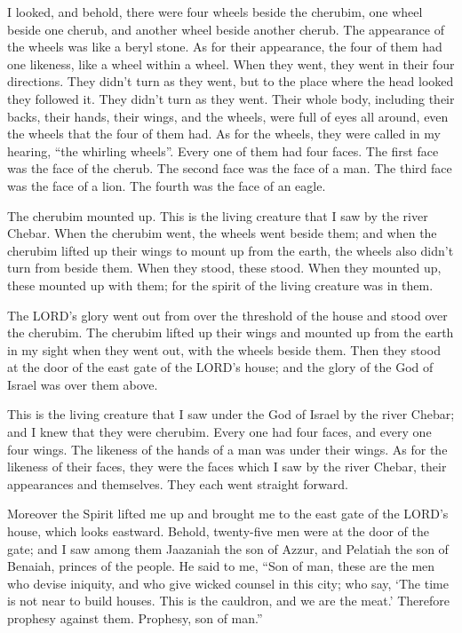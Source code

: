 \myverse{}I looked, and behold, there were four wheels beside the cherubim,
one wheel beside one cherub, and another wheel beside another cherub. The appearance of the wheels was
like a beryl stone.
\myverse{}As for their appearance, the four of them had one likeness, like a wheel
within a wheel.
\myverse{}When they went, they went in their four directions. They didn’t turn as they
went, but to the place where the head looked they followed it. They didn’t turn as they went.
\myverse{}Their whole body, including their backs, their hands, their wings, and the
wheels, were full of eyes all around, even the wheels that the four of them had.
\myverse{}As for the wheels, they were called in my hearing, “the whirling wheels”.
\myverse{}Every one of them had four faces. The first face was the face of the cherub.
The second face was the face of a man. The third face was the face of a lion. The fourth was the face
of an eagle.

\myverse{}The cherubim mounted up. This is the living creature that I
saw by the river Chebar.
\myverse{}When the cherubim went, the wheels went beside them; and when the cherubim
lifted up their wings to mount up from the earth, the wheels also didn’t turn from beside them.
\myverse{}When they stood, these stood. When they mounted up, these mounted up with
them; for the spirit of the living creature was in them.

\myverse{}The LORD’s glory went out from over the threshold of the house
and stood over the cherubim.
\myverse{}The cherubim lifted up their wings and mounted up from the earth in my sight
when they went out, with the wheels beside them. Then they stood at the door of the east gate of the LORD’s
house; and the glory of the God of Israel was over them above.

\myverse{}This is the living creature that I saw under the God of Israel
by the river Chebar; and I knew that they were cherubim.
\myverse{}Every one had four faces, and every one four wings. The likeness of the hands
of a man was under their wings.
\myverse{}As for the likeness of their faces, they were the faces which I saw by the
river Chebar, their appearances and themselves. They each went straight forward.


\mychapter{} \myverse*{}Moreover the Spirit lifted me up and brought me to the east gate
of the LORD’s house, which looks eastward. Behold, twenty-five men were at the door of the gate; and I
saw among them Jaazaniah the son of Azzur, and Pelatiah the son of Benaiah, princes of the people.
\myverse{}He said to me, “Son of man, these are the men who devise iniquity, and who
give wicked counsel in this city;
\myverse{}who say, ‘The time is not near to build houses. This is the cauldron, and we
are the meat.’
\myverse{}Therefore prophesy against them. Prophesy, son of man.”

